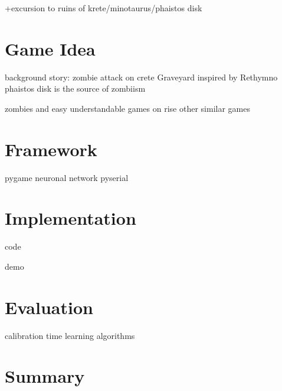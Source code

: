 \documentclass[bibtotocnumbered, headsepline,normalheadings,12pt]{report}
\begin{document}
+excursion to ruins of krete/minotaurus/phaistos disk

\chapter{Game Idea}
\label{chap:idea}

background story:
zombie attack on crete
Graveyard inspired by Rethymno
phaistos disk is the source of zombiism

zombies and easy understandable games on rise
other similar games


\chapter{Framework}
\label{chap:framework}

pygame
neuronal network
pyserial

\chapter{Implementation}
\label{chap:impl}

code

demo

\chapter{Evaluation}
\label{chap:eva}

calibration time
learning algorithms

\chapter{Summary}
\label{chap:sum}

\nocite{*}


\listoffigures
\lstlistoflistings
\begingroup \let\clearpage\relax
\listoftables \endgroup
\end{document}
